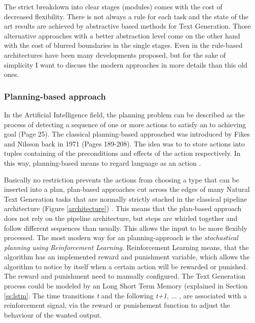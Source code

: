 The strict breakdown into clear stages (modules) comes with the cost of decreased flexibility. There is not always a rule for each task and the state of the art results are achieved by abstractive based methods for Text Generation. Those alternative approaches with a better abstraction level come on the other hand with the cost of blurred boundaries in the single stages. Even in the rule-based architectures have been many developments proposed, but for the sake of simplicity I want to discuss the modern approaches in more details than this old ones.

\subsubsection{Planning-based approach}

In the Artificial Intelligence field, the planning problem can be described as the process of detecting a sequence of one or more actions to satisfy an to achieving goal \cite{gatt} (Page 25). The classical planning-based approached was introduced by Fikes and Nilsson back in 1971 \cite{Fikes:71} (Pages 189-208). The idea was to to store actions into tuples containing of the preconditions and effects of the action respectively. In this way, planning-based means to regard language as an action \cite{clark}. 

Basically no restriction prevents the actions from choosing a type that can be inserted into a plan, plan-based approaches cut across the edges of many Natural Text Generation tasks that are normally strictly stacked in the classical pipeline architecture (Figure \ref{architecture}) \cite{gatt}. This means that the plan-based approach does not rely on the pipeline architecture, but steps are whirled together and follow different sequences than usually. This allows the input to be more flexibly processed. The most modern way for an planning-approach is the \textit{stochastical planning using Reinforcement Learning}. Reinforcement Learning means, that the algorithm has an implemented reward and punishment variable, which allows the algorithm to notice by itself when a certain action will be rewarded or punished. The reward and punishment need to manually configured. The Text Generation process could be modeled by an Long Short Term Memory (explained in Section \ref{ss:lstm}. The time transitions \textit{t} and the following \textit{t+1}, ... , are associated with a reinforcement signal, via the reward or punishement function to adjust the behaviour of the wanted output. 
	
